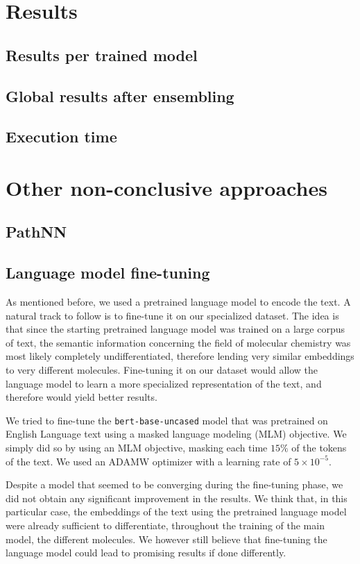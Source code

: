 \documentclass[switch, 12pt]{article}
\begin{document}
\begin{multicols}{2}

    \section{Results}
    \subsection{Results per trained model}
    \subsection{Global results after ensembling}
    \subsection{Execution time}

    \section{Other non-conclusive approaches}
    \label{sec:non-conclusive}
    \subsection{PathNN}
    \subsection{Language model fine-tuning}
    As mentioned before, we used a pretrained language model to encode the text. A natural track to follow is to fine-tune it on our specialized dataset. The idea is that since the starting pretrained language model was trained on a large corpus of text, the semantic information concerning the field of molecular chemistry was most likely completely undifferentiated, therefore lending very similar embeddings to very different molecules. Fine-tuning it on our dataset would allow the language model to learn a more specialized representation of the text, and therefore would yield better results.

    We tried to fine-tune the \texttt{bert-base-uncased} model that was pretrained on English Language text using a masked language modeling (MLM) objective. We simply did so by using an MLM objective, masking each time $15\%$ of the tokens of the text. We used an ADAMW optimizer with a learning rate of $5\times 10^{-5}$.

    Despite a model that seemed to be converging during the fine-tuning phase, we did not obtain any significant improvement in the results. We think that, in this particular case, the embeddings of the text using the pretrained language model were already sufficient to differentiate, throughout the training of the main model, the different molecules. We however still believe that fine-tuning the language model could lead to promising results if done differently.

\end{multicols}
\end{document}
